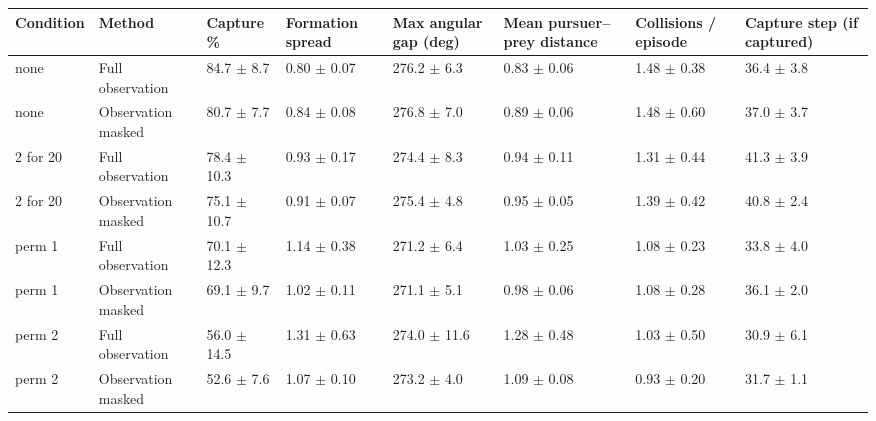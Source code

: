 \begin{tabular}{llllllll}
\toprule
Condition & Method & Capture \% & Formation spread & Max angular gap (deg) & Mean pursuer–prey distance & Collisions / episode & Capture step (if captured) \\
\midrule
none & Full observation & 84.7 $\pm$ 8.7 & 0.80 $\pm$ 0.07 & 276.2 $\pm$ 6.3 & 0.83 $\pm$ 0.06 & 1.48 $\pm$ 0.38 & 36.4 $\pm$ 3.8 \\
none & Observation masked & 80.7 $\pm$ 7.7 & 0.84 $\pm$ 0.08 & 276.8 $\pm$ 7.0 & 0.89 $\pm$ 0.06 & 1.48 $\pm$ 0.60 & 37.0 $\pm$ 3.7 \\
2 for 20 & Full observation & 78.4 $\pm$ 10.3 & 0.93 $\pm$ 0.17 & 274.4 $\pm$ 8.3 & 0.94 $\pm$ 0.11 & 1.31 $\pm$ 0.44 & 41.3 $\pm$ 3.9 \\
2 for 20 & Observation masked & 75.1 $\pm$ 10.7 & 0.91 $\pm$ 0.07 & 275.4 $\pm$ 4.8 & 0.95 $\pm$ 0.05 & 1.39 $\pm$ 0.42 & 40.8 $\pm$ 2.4 \\
perm  1 & Full observation & 70.1 $\pm$ 12.3 & 1.14 $\pm$ 0.38 & 271.2 $\pm$ 6.4 & 1.03 $\pm$ 0.25 & 1.08 $\pm$ 0.23 & 33.8 $\pm$ 4.0 \\
perm  1 & Observation masked & 69.1 $\pm$ 9.7 & 1.02 $\pm$ 0.11 & 271.1 $\pm$ 5.1 & 0.98 $\pm$ 0.06 & 1.08 $\pm$ 0.28 & 36.1 $\pm$ 2.0 \\
perm  2 & Full observation & 56.0 $\pm$ 14.5 & 1.31 $\pm$ 0.63 & 274.0 $\pm$ 11.6 & 1.28 $\pm$ 0.48 & 1.03 $\pm$ 0.50 & 30.9 $\pm$ 6.1 \\
perm  2 & Observation masked & 52.6 $\pm$ 7.6 & 1.07 $\pm$ 0.10 & 273.2 $\pm$ 4.0 & 1.09 $\pm$ 0.08 & 0.93 $\pm$ 0.20 & 31.7 $\pm$ 1.1 \\
\bottomrule
\end{tabular}
